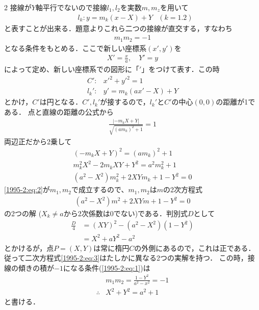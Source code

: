 \documentclass[../../main.tex]{subfiles}
\begin{document}
\begin{multicols}{2}
  接線が$Y$軸平行でないので接線$l_1, l_2$を実数$m, m_z$を用いて
  \begin{align*}
     & l_k: y = m_k(x-X)+Y & (k=1.2)
  \end{align*}
  と表すことが出来る．題意よりこれら二つの接線が直交する，すなわち
  \begin{align}
    m_1m_2=-1 \label{1995-2:eq:1}
  \end{align}
  となる条件をもとめる．ここで新しい座標系$(x', y')$を
  \begin{align*}
    X'=\frac{x}{a}, \quad Y'=y
  \end{align*}
  によって定め、新しい座標系での図形に「$'$」をつけて表す．この時
  \begin{align*}
    C':   & x'^2+y'^2=1     \\
    l_k': & y'=m_k(ax'-X)+Y
  \end{align*}
  とかけ，$C'$は円となる．$C', l_k'$が接するので，$l_k'$と$C'$の中心$(0,0)$の距離が1である．
  点と直線の距離の公式から
  \begin{align*}
    \frac{|-m_k X+Y|}{\sqrt{(am_k)^2+1}}=1
  \end{align*}
  両辺正だから2乗して
  \begin{align}
    (-m_k X+Y)^2 = (am_k)^2+1 \nonumber                 \\
    m_k^2 X^2 - 2m_k XY + Y^2 = a^2 m_k^2 + 1 \nonumber \\
    (a^2-X^2)m_k^2 + 2XY m_k + 1- Y^2 = 0 \label{1995-2:eq:2}
  \end{align}
  \cref{1995-2:eq:2}が$m_1, m_2$で成立するので、$m_1, m_2$は$m$の2次方程式
  \begin{align}
    (a^2-X^2)m^2+2XY m + 1-Y^2 = 0   \label{1995-2:eq:3}
  \end{align}
  の2つの解 ($X_k \neq a$から2次係数は$0$でない)である．判別式$D$として
  \begin{align*}
    \frac{D}{4}
     & =(XY)^2-(a^2-X^2)(1-Y^2) \\
     & =X^2 + aY^2-a^2
  \end{align*}
  とかけるが，点$P=(X,Y)$は常に楕円$C$の外側にあるので，これは正である．
  従って二次方程式\cref{1995-2:eq:3}はたしかに異なる2つの実解を持つ．
  この時，接線の傾きの積が$-1$になる条件(\cref{1995-2:eq:1})は
  \begin{align}
     & m_1m_2 = \frac{1-Y^2}{a^2-x^2}=-1 \nonumber \\
    \therefore
     & X^2+Y^2=a^2+1  \label{1995-2:eq:4}
  \end{align}
  と書ける．


\end{multicols}
\end{document}
